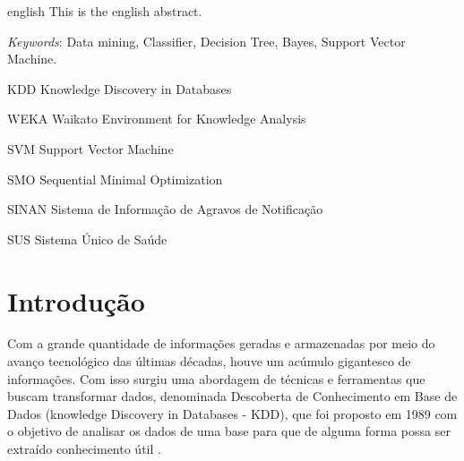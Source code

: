 \documentclass[
	12pt,				%
	openright,			%
	oneside,	
	a4paper,				%
	english,				%
	brazil				%
]{abntex2/abntex2} %
\begin{document}

\begin{resumo}[Abstract]
 \begin{otherlanguage*}{english}
   This is the english abstract.

   \vspace{\onelineskip}
 
   \noindent 
   \textit{Keywords}: Data mining, Classifier, Decision Tree, Bayes, Support Vector Machine.
 \end{otherlanguage*}
\end{resumo}

\listoffigures*
\cleardoublepage

\listoftables*
\cleardoublepage

\begin{siglas}
  \item[KDD] Knowledge Discovery in Databases
  \item[WEKA] Waikato Environment for Knowledge Analysis
  \item[SVM] Support Vector Machine
  \item[SMO] Sequential Minimal Optimization
  \item[SINAN] Sistema de Informação de Agravos de Notificação
  \item[SUS] Sistema Único de Saúde
\end{siglas}




\tableofcontents*
\cleardoublepage

\textual

\chapter{Introdução}

	Com a grande quantidade de informações geradas e armazenadas por meio do avanço tecnológico das últimas décadas, houve um acúmulo gigantesco de informações. Com isso surgiu uma abordagem de técnicas e ferramentas que buscam transformar dados, denominada Descoberta de Conhecimento em Base de Dados (knowledge Discovery in Databases - KDD), que foi proposto em 1989 com o objetivo de analisar os dados de uma base para que de alguma forma possa ser extraído conhecimento útil \cite{fayyad:1996}.	
	
\end{document}
